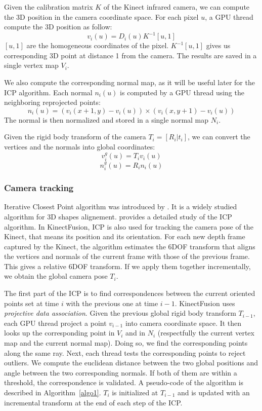 \documentclass[12pt]{article}
\begin{document}
Given the calibration matrix $K$ of the Kinect infrared camera, we can compute the 3D position in the camera coordinate space. For each pixel $u$, a GPU thread compute the 3D position as follow:
$$v_i(u) = D_i(u)K^{-1}[u,1]$$
$[u,1]$ are the homogeneous coordinates of the pixel. $K^{-1}[u,1]$ gives us corresponding 3D point at distance 1 from the camera. The results are saved in a single vertex map $V_i$.

We also compute the corresponding normal map, as it will be useful later for the ICP algorithm. Each normal $n_i(u)$ is computed by a GPU thread using the neighboring reprojected points:
$$n_i(u) = (v_i(x+1,y) - v_i(u))\times (v_i(x,y+1) - v_i(u))$$
The normal is then normalized and stored in a single normal map $N_i$.

Given the rigid body transform of the camera $T_i = [R_i|t_i]$, we can convert the vertices and the normals into global coordinates:
$$v_i^g(u) = T_iv_i(u)$$
$$n_i^g(u) = R_in_i(u)$$

\subsubsection{Camera tracking}
Iterative Closest Point algorithm was introduced by \cite{ICP1}. It is a widely studied algorithm for 3D shapes alignement. \cite{ICP2} provides a detailed study of the ICP algorithm. In KinectFusion, ICP is also used for tracking the camera pose of the Kinect, that means its position and its orientation. For each new depth frame captured by the Kinect, the algorithm estimates the 6DOF transform that aligns the vertices and normals of the current frame with those of the previous frame. This gives a relative 6DOF transform. If we apply them together incrementally, we obtain the global camera pose $T_i$.

The first part of the ICP is to find correspondences between the current oriented points set at time $i$ with the previous one at time $i-1$. KinectFusion uses \textit{projective data association}. Given the previous global rigid body transform $T_{i-1}$, each GPU thread project a point $v_{i-1}$ into camera coordinate space. It then looks up the corresponding point in $V_i$ and in $N_i$ (respectfully the current vertex map and the current normal map). Doing so, we find the corresponding points along the same ray. Next, each thread tests the corresponding points to reject outliers. We compute the euclidean distance between the two global positions and angle between the two corresponding normals. If both of them are within a threshold, the correspondence is validated. A pseudo-code of the algorithm is described in Algorithm~\ref{algo1}. $T_i$ is initialized at $T_{i-1}$ and is updated with an incremental transform at the end of each step of the ICP.
\end{document}
